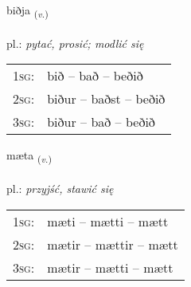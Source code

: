 \documentclass[frontgrid, backgrid]{flacards}\usepackage[]{graphicx}\usepackage[]{xcolor}
\begin{document}
\renewcommand{\flhead}{\vskip5pt \fboxsep=0pt {\small\bfseries\footnotesize Sagnorð | Verb}}
\renewcommand{\fcfoot}{\vskip5pt \fboxsep=0pt \hspace{2pt}{\small\bfseries\footnotesize 1K}}

\renewcommand{\blhead}{\vskip5pt {\small\bfseries\footnotesize Sagnorð | Verb }}
\renewcommand{\bcfoot}{\vskip5pt \hspace{2pt}{\small\bfseries\footnotesize 1K}}


{biðja \small{\textsubscript{(\textit{v.})}} \\[1ex] %
\textphonetic{[pɪðja]} \\
pl.: \emph{pytać, prosić; modlić się} \\  [2ex]
\renewcommand*{\arraystretch}{0.8}
\begin{tabular}{p{1cm}l}
\textsc{1sg}: & bið -- bað -- beðið \\ 
\textsc{2sg}: & biður -- baðst -- beðið \\ 
\textsc{3sg}: & biður -- bað -- beðið \\ 
\end{tabular}
}

\renewcommand{\flhead}{\vskip5pt \fboxsep=0pt {\small\bfseries\footnotesize Sagnorð | Verb}}
\renewcommand{\fcfoot}{\vskip5pt \fboxsep=0pt \hspace{2pt}{\small\bfseries\footnotesize 1K}}

\renewcommand{\blhead}{\vskip5pt {\small\bfseries\footnotesize Sagnorð | Verb }}
\renewcommand{\bcfoot}{\vskip5pt \hspace{2pt}{\small\bfseries\footnotesize 1K}}


{mæta \small{\textsubscript{(\textit{v.})}} \\[1ex] %
\textphonetic{[maiːta]} \\
pl.: \emph{przyjść, stawić się} \\  [2ex]
\renewcommand*{\arraystretch}{0.8}
\begin{tabular}{p{1cm}l}
\textsc{1sg}: & mæti -- mætti -- mætt \\ 
\textsc{2sg}: & mætir -- mættir -- mætt \\ 
\textsc{3sg}: & mætir -- mætti -- mætt \\ 
\end{tabular}
}
\end{document}
